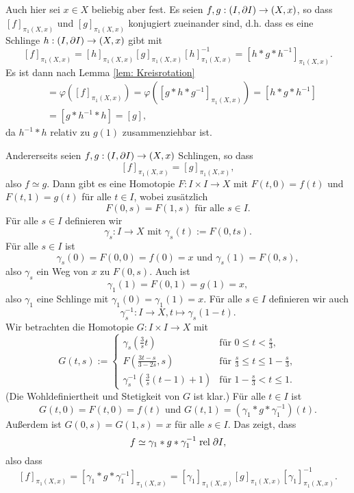 \documentclass[a4paper,10pt]{article}
\begin{document}
\subsection{}
Auch hier sei $x \in X$ beliebig aber fest. Es seien $f, g : (I, \partial I) \to (X,x)$, so dass $[f]_{\pi_1(X,x)}$ und $[g]_{\pi_1(X,x)}$ konjugiert zueinander sind, d.h. dass es eine Schlinge $h : (I, \partial I) \to (X,x)$ gibt mit
\[
 [f]_{\pi_1(X,x)} = [h]_{\pi_1(X,x)} [g]_{\pi_1(X,x)} [h]_{\pi_1(X,x)}^{-1} = \left[h * g * h^{-1}\right]_{\pi_1(X,x)}.
\]
Es ist dann nach Lemma \ref{lem: Kreisrotation}
\begin{align*}
 [f]
 &= \varphi([f]_{\pi_1(X,x)})
 = \varphi\left(\left[g * h * g^{-1}\right]_{\pi_1(X,x)} \right)
 = \left[h * g * h^{-1}\right] \\
 &= \left[g * h^{-1} * h \right]
 = [g],
\end{align*}
da $h^{-1} * h$ relativ zu $g(1)$ zusammenziehbar ist.

Andererseits seien $f,g : (I, \partial I) \to (X,x)$ Schlingen, so dass
\[
 [f]_{\pi_1(X,x)} = [g]_{\pi_1(X,x)},
\]
also $f \simeq g$. Dann gibt es eine Homotopie $F : I \times I \to X$ mit $F(t,0) = f(t)$ und $F(t,1) = g(t)$ für alle $t \in I$, wobei zusätzlich
\[
 F(0,s) = F(1,s) \text{ für alle } s \in I.
\]
Für alle $s \in I$ definieren wir
\[
 \gamma_s : I \to X \text{ mit } \gamma_s(t) := F(0,ts).
\]
Für alle $s \in I$ ist
\[
 \gamma_s(0) = F(0,0) = f(0) = x \text{ und }
 \gamma_s(1) = F(0,s),
\]
also $\gamma_s$ ein Weg von $x$ zu $F(0,s)$. Auch ist
\[
 \gamma_1(1) = F(0,1) = g(1) = x,
\]
also $\gamma_1$ eine Schlinge mit $\gamma_1(0) = \gamma_1(1) = x$. Für alle $s \in I$ definieren wir auch
\[
 \gamma_s^{-1} : I \to X, t \mapsto \gamma_s(1-t).
\]
Wir betrachten die Homotopie $G : I \times I \to X$ mit
\[
 G(t,s) :=
 \begin{cases}
  \gamma_s\left( \frac{3}{s} t \right)             & \text{für } 0 \leq t < \frac{s}{3}, \\
  F\left( \frac{3t-s}{3-2s}, s\right)              & \text{für } \frac{s}{3} \leq t \leq 1-\frac{s}{3}, \\
  \gamma_s^{-1}\left( \frac{3}{s}(t-1) + 1 \right) & \text{für } 1-\frac{s}{3} < t \leq 1.
 \end{cases}
\]
(Die Wohldefiniertheit und Stetigkeit von $G$ ist klar.) Für alle $t \in I$ ist
\[
 G(t,0) = F(t,0) = f(t) \text{ und } G(t,1) = \left( \gamma_1 * g * \gamma_1^{-1} \right)(t).
\]
Außerdem ist $G(0,s) = G(1,s) = x$ für alle $s \in I$. Das zeigt, dass
\[
 f \simeq \gamma_1 * g * \gamma_1^{-1} \mathrel{\operatorname{rel}} \partial I,
\]
also dass
\[
 [f]_{\pi_1(X,x)}
 = \left[ \gamma_1 * g * \gamma_1^{-1} \right]_{\pi_1(X,x)}
 = \left[ \gamma_1 \right]_{\pi_1(X,x)} \left[ g \right]_{\pi_1(X,x)} \left[ \gamma_1 \right]^{-1}_{\pi_1(X,x)}.
\]
\end{document}
